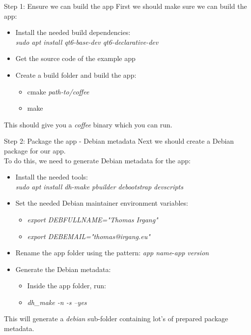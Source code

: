 \documentclass{beamer}
\begin{document}
\begin{frame}{Step 1: Ensure we can build the app}
	First we should make sure we can build the app:
	\begin{itemize}
		\item Install the needed build dependencies:\\
			\emph{sudo apt install qt6-base-dev qt6-declarative-dev}
		\item Get the source code of the example app
		\item Create a build folder and build the app:
		\begin{itemize}
			\item cmake \emph{path-to/coffee}
			\item make
		\end{itemize}
	\end{itemize}
	This should give you a \emph{coffee} binary which you can run.
\end{frame}

\begin{frame}{Step 2: Package the app - Debian metadata}
	Next we should create a Debian package for our app.\\
	To do this, we need to generate Debian metadata for the app:
	\begin{itemize}
		\item Install the needed tools:\\
		\emph{sudo apt install dh-make pbuilder debootstrap devscripts}
		\item Set the needed Debian maintainer environment variables:
		\begin{itemize}
			\item \emph{export DEBFULLNAME="Thomas Irgang"}
			\item \emph{export DEBEMAIL="thomas@irgang.eu"}
		\end{itemize}
		\item Rename the app folder using the pattern: \emph{app name}-\emph{app version}
		\item Generate the Debian metadata:
		\begin{itemize}
			\item Inside the app folder, run:
			\item \emph{dh\_make -n -s --yes}
		\end{itemize}
	\end{itemize}
	This will generate a \emph{debian} sub-folder containing lot's of prepared package metadata.
\end{frame}
\end{document}
